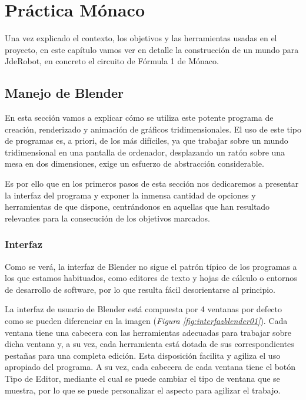 \chapter{Práctica Mónaco}
\label{ch:PracticaMonaco}

Una vez explicado el contexto, los objetivos y las herramientas usadas en el proyecto, en este capítulo vamos ver en detalle la construcción de un mundo para JdeRobot, en concreto el circuito de Fórmula 1 de Mónaco.


\section{Manejo de Blender}
\label{sec:pm_manejodeblender}

En esta sección vamos a explicar cómo se utiliza este potente programa de creación, renderizado y animación de gráficos tridimensionales. El uso de este tipo de programas es, a priori, de los más difíciles, ya que trabajar sobre un mundo tridimensional en una pantalla de ordenador, desplazando un ratón sobre una mesa en dos dimensiones, exige un esfuerzo de abstracción considerable.


Es por ello que en los primeros pasos de esta sección nos dedicaremos a presentar la interfaz del programa y exponer la inmensa cantidad de opciones y herramientas de que dispone, centrándonos en aquellas que han resultado relevantes para la consecución de los objetivos marcados.


\subsection{Interfaz}
\label{subsec:pm_interfaz}

Como se verá, la interfaz de Blender no sigue el patrón típico de los programas a los que estamos habituados, como editores de texto y hojas de cálculo o entornos de desarrollo de software, por lo que resulta fácil desorientarse al principio.

La interfaz de usuario de Blender está compuesta por 4 ventanas por defecto como se pueden diferenciar en la imagen (\textit{Figura \ref{fig:interfazblender01}}). Cada ventana tiene una cabecera con las herramientas adecuadas para trabajar sobre
dicha ventana y, a su vez, cada herramienta está dotada de sus correspondientes pestañas para una completa edición. Esta disposición facilita y agiliza el uso apropiado del programa. A su vez, cada cabecera de cada ventana tiene el botón Tipo de Editor, mediante el cual se puede cambiar el tipo de ventana que se muestra, por lo que se puede personalizar el aspecto para agilizar el trabajo.

